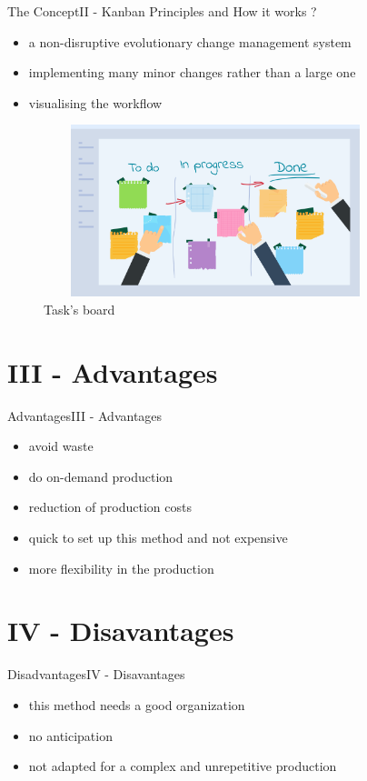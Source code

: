 \documentclass[10pt]{beamer}
\newcommand{\PII}{II - Kanban Principles and How it works ?}
\newcommand{\PIII}{III - Advantages}
\newcommand{\PIV}{IV - Disavantages}
\begin{document}
\begin{frame}{The Concept}{\PII}
    \begin{itemize}
        \item a non-disruptive evolutionary change management system
        \item implementing many minor changes rather than a large one
        \item visualising the workflow
    \end{itemize}
     \begin{figure}
      \centering
   \includegraphics[width=10cm, height=5cm]{ph.png}
      \caption{Task's board}
     \end{figure}
\end{frame}

\section{\PIII} 
\begin{frame}{Advantages}{\PIII}
    \begin{itemize}
        \item avoid waste
        \item do on-demand production
        \item reduction of production costs
        \item quick to set up this method and not expensive
        \item more flexibility in the production
    \end{itemize}

\end{frame}

\section{\PIV} 
\begin{frame}{Disadvantages}{\PIV}
    \begin{itemize}
        \item this method needs a good organization
        \item no anticipation
        \item not adapted for a complex and unrepetitive production
    \end{itemize}
\end{frame}
\end{document}
